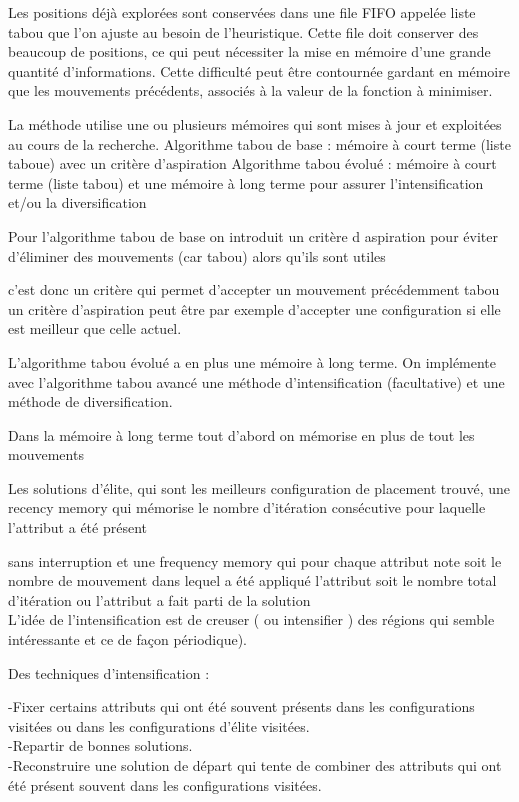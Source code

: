 \documentclass{report}
\begin{document}
Les positions déjà explorées sont conservées dans une file FIFO appelée liste tabou que l'on ajuste au besoin de l'heuristique. Cette file doit conserver des beaucoup de positions, ce qui peut  nécessiter la mise en mémoire d'une grande quantité d'informations. Cette difficulté peut être contournée gardant en mémoire que les mouvements précédents, associés à la valeur de la fonction à minimiser.

La méthode utilise une ou plusieurs mémoires  qui sont mises à jour
et exploitées au cours de la recherche.
Algorithme tabou de base : mémoire à court terme (liste taboue) avec un critère d'aspiration
Algorithme tabou évolué : mémoire à court terme (liste tabou) et une mémoire à
long terme pour assurer l’intensification et/ou la diversification

Pour l’algorithme tabou de base on introduit un critère d aspiration
pour éviter d’éliminer des mouvements (car tabou) alors qu’ils sont utiles

c’est donc un critère qui permet d’accepter un mouvement précédemment tabou
un critère d’aspiration peut être par exemple d’accepter une configuration si elle est meilleur que celle actuel.

L’algorithme tabou évolué a en plus une mémoire à long terme. On implémente avec l’algorithme tabou avancé une méthode d’intensification (facultative) et une méthode de diversification.

Dans la mémoire à long terme tout d’abord on mémorise en plus de tout les mouvements

Les solutions d’élite, qui sont les meilleurs configuration de placement trouvé, une recency memory qui mémorise le nombre d'itération consécutive pour laquelle l’attribut a été présent

sans interruption et une frequency memory qui pour chaque attribut note soit le nombre de mouvement dans lequel a été appliqué l’attribut soit le nombre total d’itération ou l’attribut a fait parti de la solution\\

L’idée de l’intensification est de creuser ( ou intensifier ) des régions qui semble intéressante
et ce de façon périodique).

Des techniques d’intensification :

-Fixer certains attributs qui ont été souvent présents dans les configurations visitées
ou dans les configurations d’élite visitées.\\
-Repartir de bonnes solutions.\\
-Reconstruire une solution de départ qui tente de combiner des attributs qui ont été
présent souvent dans les configurations visitées.\\
\end{document}
